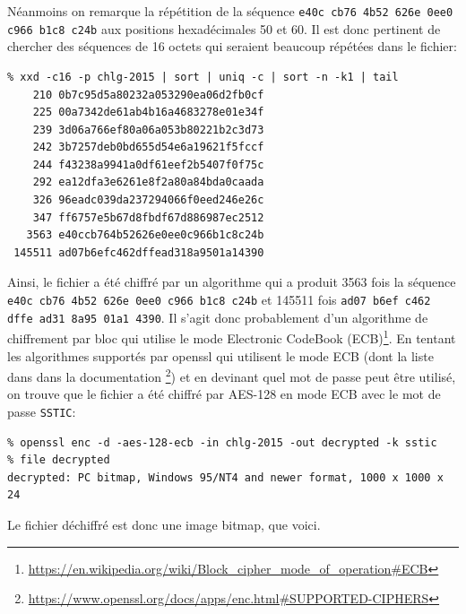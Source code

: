 \documentclass[a4paper,10pt]{article}
\begin{document}
Néanmoins on remarque la répétition de la séquence \texttt{e40c cb76 4b52 626e 0ee0 c966 b1c8 c24b} aux positions hexadécimales 50 et 60.
Il est donc pertinent de chercher des séquences de 16 octets qui seraient beaucoup répétées dans le fichier:

\begin{verbatim}
% xxd -c16 -p chlg-2015 | sort | uniq -c | sort -n -k1 | tail
    210 0b7c95d5a80232a053290ea06d2fb0cf
    225 00a7342de61ab4b16a4683278e01e34f
    239 3d06a766ef80a06a053b80221b2c3d73
    242 3b7257deb0bd655d54e6a19621f5fccf
    244 f43238a9941a0df61eef2b5407f0f75c
    292 ea12dfa3e6261e8f2a80a84bda0caada
    326 96eadc039da237294066f0eed246e26c
    347 ff6757e5b67d8fbdf67d886987ec2512
   3563 e40ccb764b52626e0ee0c966b1c8c24b
 145511 ad07b6efc462dffead318a9501a14390
\end{verbatim}

Ainsi, le fichier a été chiffré par un algorithme qui a produit 3563 fois la séquence \texttt{e40c cb76 4b52 626e 0ee0 c966 b1c8 c24b} et 145511 fois \texttt{ad07 b6ef c462 dffe ad31 8a95 01a1 4390}.
Il s'agit donc probablement d'un algorithme de chiffrement par bloc qui utilise le mode Electronic CodeBook (ECB)\footnote{\url{https://en.wikipedia.org/wiki/Block_cipher_mode_of_operation\#ECB}}.
En tentant les algorithmes supportés par openssl qui utilisent le mode ECB (dont la liste dans dans la documentation \footnote{\url{https://www.openssl.org/docs/apps/enc.html\#SUPPORTED-CIPHERS}}) et en devinant quel mot de passe peut être utilisé, on trouve que le fichier a été chiffré par AES-128 en mode ECB avec le mot de passe \texttt{SSTIC}:

\begin{verbatim}
% openssl enc -d -aes-128-ecb -in chlg-2015 -out decrypted -k sstic
% file decrypted
decrypted: PC bitmap, Windows 95/NT4 and newer format, 1000 x 1000 x 24
\end{verbatim}

Le fichier déchiffré est donc une image bitmap, que voici.
\end{document}

